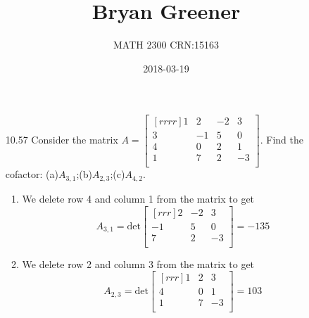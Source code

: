 \documentclass[12pt]{article}
\title{Bryan Greener}
\author{MATH 2300 CRN:15163}
\date{2018-03-19}
\theoremstyle{definition}
\theoremstyle{plain}
\begin{document}
\maketitle

\TabPositions{4cm}

\begin{enumerate}
\item[10.57]Consider the matrix $A=\begin{bmatrix}[rrrr]1&2&-2&3\\3&-1&5&0\\4&0&2&1\\1&7&2&-3\\\end{bmatrix}$. Find the cofactor: (a)$A_{3,1}$;(b)$A_{2,3}$;(c)$A_{4,2}$.
	\begin{enumerate}
	\item We delete row 4 and column 1 from the matrix to get
	\[ A_{3,1}=\mathrm{det}\begin{bmatrix}[rrr]2&-2&3\\-1&5&0\\7&2&-3\\\end{bmatrix} = -135 \]
	\item We delete row 2 and column 3 from the matrix to get
	\[ A_{2,3}=\mathrm{det}\begin{bmatrix}[rrr]1&2&3\\4&0&1\\1&7&-3\\\end{bmatrix} = 103 \]
	\end{enumerate}
	

\end{enumerate}
\end{document}
